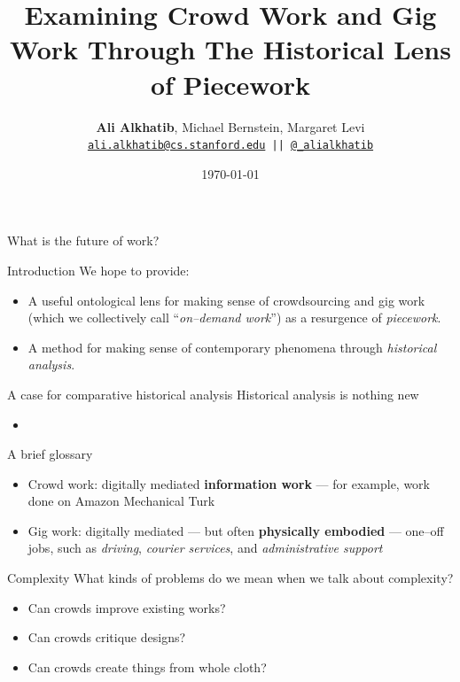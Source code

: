 \documentclass{beamer}
\title{Examining Crowd Work and Gig Work Through The Historical Lens of Piecework}
\author{\textbf{Ali Alkhatib},
                Michael Bernstein,
                Margaret Levi\\
\texttt{ \scriptsize{\href{mailto:ali.alkhatib@cs.stanford.edu}{ali.alkhatib@cs.stanford.edu} ||
         \href{http://twitter.com/_alialkhatib}{@\_alialkhatib}} }}
\institute[Stanford]{Stanford University}
\date{\today}
\makeatletter
\newenvironment{mystepwiseitemize}{\begin{itemize}[<+-| alert@+>]}{\end{itemize}}
\newcommand{\onlyinsubfile}[1]{#1}
\makeatother
\begin{document}
\renewcommand{\onlyinsubfile}[1]{}
\begin{frame}
\titlepage
\end{frame}





\begin{frame}[standout]
    What is the future of work?


\end{frame}


\begin{frame}{Introduction}
  We hope to provide:
      \begin{itemize}
        \item A useful ontological lens for making sense of crowdsourcing and gig work (which we collectively call ``\textit{on--demand work}'') as a resurgence of \textit{piecework}.
        \item A method for making sense of contemporary phenomena through \textit{historical analysis}.
      \end{itemize}
\end{frame}

\begin{frame}{A case for comparative historical analysis}
Historical analysis is nothing new
    \begin{itemize}
      \item \textcite{Wyche2006,bodker1993historical}
    \end{itemize}
\end{frame}


\begin{frame}{A brief glossary}
    \begin{itemize}
      \item Crowd work: digitally mediated \textbf{information work}
      --- for example, work done on Amazon Mechanical Turk~\cite{crowdworkFuture}
      \item Gig work: digitally mediated --- but often \textbf{physically embodied} --- one--off jobs,
      such as
      \textit{driving},
      \textit{courier services},
      and \textit{administrative support}~\cite{friedman2014workers,Parigi:2016:GE:3026779.3013496}
    \end{itemize}
\end{frame}


\begin{frame}{Complexity}
  What kinds of problems do we mean when we talk about complexity?
  \begin{mystepwiseitemize}
    \item Can crowds improve existing works?~\cite{bernsteinSoylent,Kim:2014:CSI:2556288.2556986}
    \item Can crowds critique designs?~\cite{yuanAlmost}
    \item Can crowds create things from whole cloth?~\cite{KimStoria,Kim2017,Hahn:2016:KAB:2858036.2858364,Lasecki:2014:LSR:2661334.2661352}
  \end{mystepwiseitemize}
\end{frame}
\end{document}
